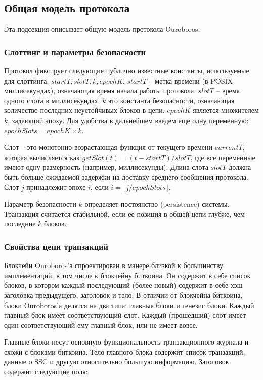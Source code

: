 \documentclass[specification,annotation]{itmo-student-thesis}
\begin{document}
\subsection{Общая модель протокола}

Эта подсекция описывает общую модель протокола Ouroboros.

\subsubsection{Слоттинг и параметры безопасности}

Протокол фиксирует следующие публично известные константы,
используемые для слоттинга: $startT, slotT, k, epochK$. $startT$ --
метка времени (в POSIX миллисекундах), означающая время начала работы
протокола. $slotT$ -- время одного слота в миллисекундах. $k$ это
константа безопасности, означающая количество последних неустойчивых
блоков в цепи. $epochK$ является множителем $k$, задающий эпоху. Для
удобства в дальнейшем введем еще одну переменную: $epochSlots = epochK
\times k$.

Слот -- это монотонно возрастающая функция от текущего времени
$currentT$, которая вычисляется как $getSlot(t) = (t - startT) /
slotT$, где все переменные имеют одну размерность (например,
миллисекунды). Длина слота $slotT$ должна быть больше ожидаемой
задержки на доставку среднего сообщения протокола.  Слот $j$
принадлежит эпохе $i$, если $i = \lfloor j / epochSlots \rfloor$.

Параметр безопасности $k$ определяет постоянство (persistence)
системы. Транзакция считается стабильной, если ее позиция в общей цепи
глубже, чем последние $k$ блоков.

\subsubsection{Свойства цепи транзакций}

Блокчейн Ouroboros'а спроектирован в манере близкой к большинству
имплементаций, в том числе к блокчейну биткоина. Он содержит в себе
список блоков, в котором каждый последующий (более новый) содержит в
себе хэш заголовка предыдущего, заголовок и тело. В отличии от
блокчейна биткоина, блоки Ouroboros'а делятся на два типа: главные
блоки и генезис блоки. Каждый главный блок имеет соответствующий
слот. Каждый (прошедший) слот имеет один соответствующий ему главный
блок, или не имеет вовсе.

Главные блоки несут основную функциональность транзакционного журнала
и схожи с блоками биткоина. Тело главного блока содержит список
транзакций, данные о SSC и другую относительно большую
информацию. Заголовок содержит следующие поля:
\end{document}
